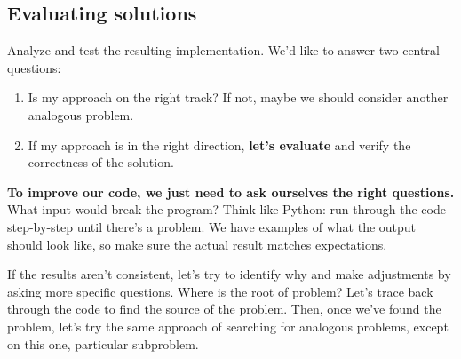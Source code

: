 \subsection*{Evaluating solutions}

Analyze and test the resulting implementation. We'd like to answer two central
questions:

\begin{enumerate}
\item Is my approach on the right track? If not, maybe we should consider
another analogous problem.
\item If my approach is in the right direction, \textbf{let's evaluate} and
verify the correctness of the solution.
\end{enumerate}

\textbf{To improve our code, we just need to ask ourselves the right
questions.} What input would break the program? Think like Python: run through
the code step-by-step until there's a problem. We have examples of what the
output should look like, so make sure the actual result matches expectations.

If the results aren't consistent, let's try to identify why and make
adjustments by asking more specific questions. Where is the root of problem?
Let's trace back through the code to find the source of the problem. Then, once
we've found the problem, let's try the same approach of searching for analogous
problems, except on this one, particular subproblem.
